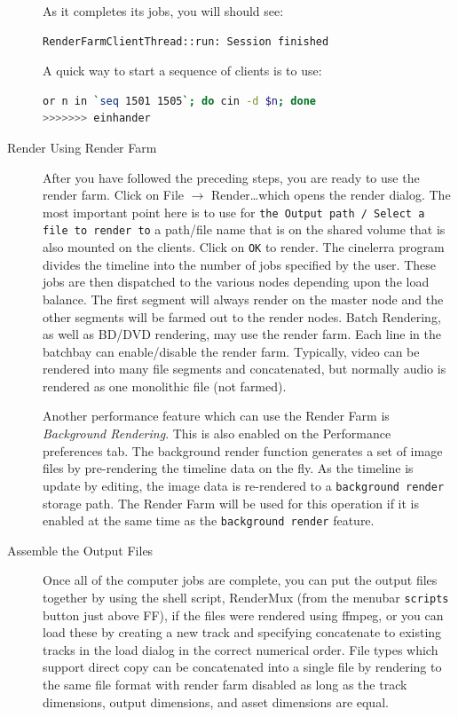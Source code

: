 \begin{description}
    As it completes its jobs, you will should see:
    \begin{lstlisting}[language=bash]
RenderFarmClientThread::run: Session finished
    \end{lstlisting}
    A quick way to start a sequence of clients is to use:
    \begin{lstlisting}[language=bash]
or n in `seq 1501 1505`; do cin -d $n; done
>>>>>>> einhander
    \end{lstlisting}
    \item[Render Using Render Farm] After you have followed the preceding steps, you are ready to use the render farm.  Click on File $\rightarrow$ Render\dots which opens the render dialog.  The most important point here is to use for \texttt{the Output path / Select a file to render to} a path/file name that is on the shared volume that is also mounted on the clients.  Click on \texttt{OK} to render. The cinelerra program divides the timeline into the number of jobs specified by the user.  These jobs are then dispatched to the various nodes depending upon the load balance. The first segment will always render on the master node and the other segments will be farmed out to the render nodes.  Batch Rendering, as well as BD/DVD rendering, may use the render farm.  Each line in the batchbay can enable/disable the render farm.  Typically, video can be rendered into many file segments and concatenated, but normally audio is rendered as one monolithic file (not farmed).
    
    Another performance feature which can use the Render Farm is \textit{Background Rendering}.  This is also enabled on the Performance preferences tab.  The background render function generates a set of image files by pre-rendering the timeline data on the fly.  As the timeline is update by editing, the image data is re-rendered to a \texttt{background render} storage path.  The Render Farm will be used for this operation if it is enabled at the same time as the \texttt{background render} feature.
    \item[Assemble the Output Files] Once all of the computer jobs are complete, you can put the output files together by using the shell script, RenderMux (from the menubar \texttt{scripts} button just above FF), if the files were rendered using ffmpeg, or you can load these by creating a new track and specifying concatenate to existing tracks in the load dialog in the correct numerical order.  File types which support direct copy can be concatenated into a single file by rendering to the same file format with render farm disabled as long as the track dimensions, output dimensions, and asset dimensions are equal.
\end{description}

